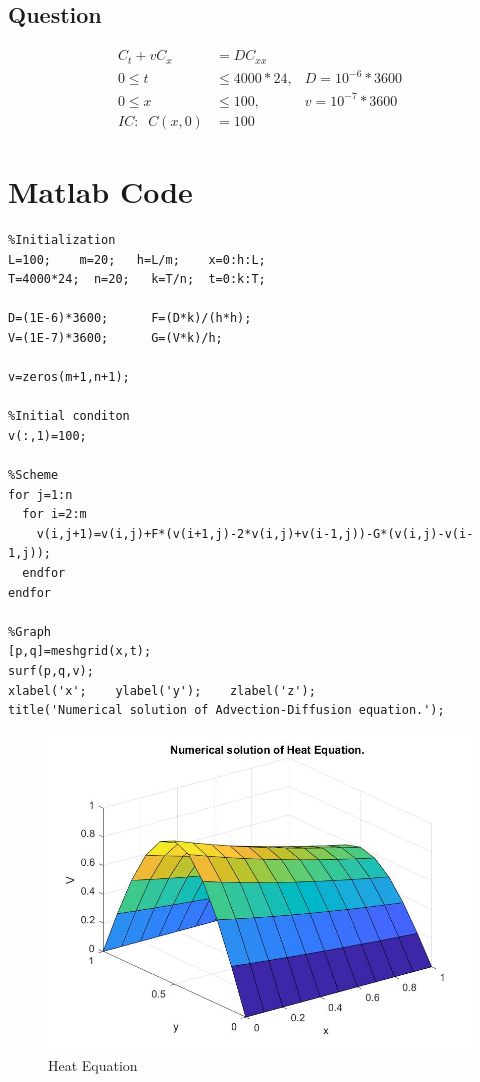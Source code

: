 \documentclass[a4paper,14pt,twoside,onecolumn,openany,final]{memoir}
\begin{document}
\subsection{Question}
\begin{align*}
  C_t + vC_x &= D C_{xx} \\
  0 \leq t &\leq 4000*24,          &       D=10^{-6}*3600\\
  0 \leq x &\leq 100,          &       v=10^{-7}*3600\\
  IC: \;\; C(x,0) &= 100
\end{align*}

\section{Matlab Code}

\begin{verbatim}
%Initialization
L=100;    m=20;   h=L/m;    x=0:h:L;
T=4000*24;  n=20;   k=T/n;  t=0:k:T;

D=(1E-6)*3600;      F=(D*k)/(h*h);
V=(1E-7)*3600;      G=(V*k)/h;

v=zeros(m+1,n+1);

%Initial conditon
v(:,1)=100;

%Scheme
for j=1:n
  for i=2:m
    v(i,j+1)=v(i,j)+F*(v(i+1,j)-2*v(i,j)+v(i-1,j))-G*(v(i,j)-v(i-1,j));
  endfor
endfor

%Graph
[p,q]=meshgrid(x,t);
surf(p,q,v);
xlabel('x';    ylabel('y');    zlabel('z');
title('Numerical solution of Advection-Diffusion equation.');
\end{verbatim}
\begin{figure}
\centering
\includegraphics[scale=0.4]{heat.jpg}
\caption{Heat Equation}
\end{figure}
\end{document}
